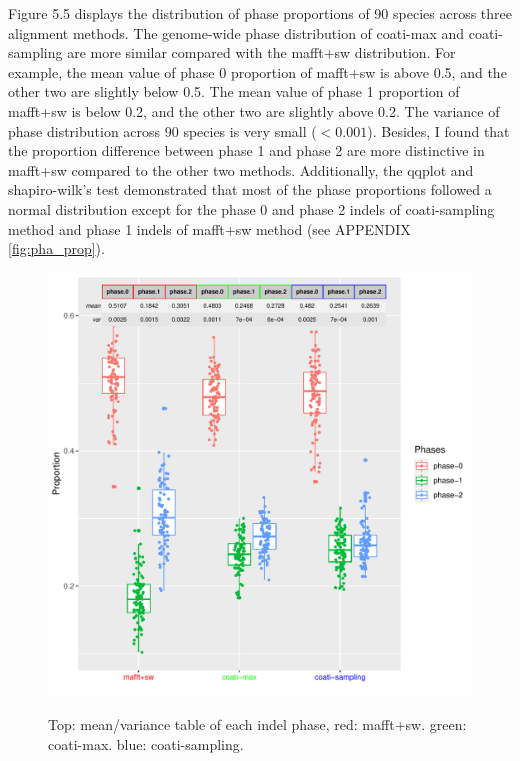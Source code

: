 \indent Figure 5.5 displays the distribution of phase proportions of 90 species across three alignment methods. The genome-wide phase distribution of coati-max and coati-sampling are more similar compared with the mafft+sw distribution.  For example, the mean value of phase 0 proportion of mafft+sw is above 0.5, and the other two are slightly below 0.5. The mean value of phase 1 proportion  of mafft+sw is below 0.2, and the other two are slightly above 0.2. The variance of phase distribution across 90 species is very small ($<0.001$). Besides, I found that the proportion difference between phase 1 and phase 2 are more distinctive in mafft+sw compared to the other two methods. Additionally, the qqplot and shapiro-wilk’s test demonstrated that most of the phase proportions followed a normal distribution except for the phase 0 and phase 2 indels of coati-sampling method and phase 1 indels of mafft+sw method (see APPENDIX \ref{fig:pha_prop}). 
\begin{figure}[H]
     \centering
     \begin{minipage}[t]{1\textwidth}
     \includegraphics[width=1\linewidth,height=1.1\linewidth]{Fig5.pdf}
     { { Top: mean/variance table of each indel phase,  red: mafft+sw. green: coati-max. blue: coati-sampling.} 
 \par}
     \end{minipage}
\end{figure}

